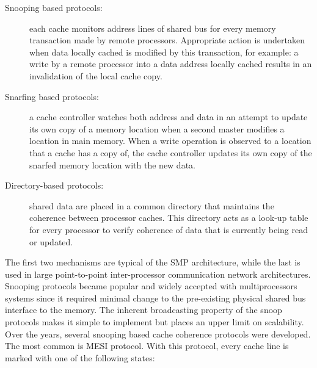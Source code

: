 \begin{description}

\item [Snooping based protocols:] each cache monitors address lines of shared bus for every memory transaction made by remote processors. Appropriate action
is undertaken when data locally cached is modified by this transaction, for example: a write by a remote processor into a data address locally cached 
results in an invalidation of the local cache copy.

\item [Snarfing based protocols:] a cache controller watches both address and data in an attempt to update its own copy of a memory location when a second 
master modifies a location in main memory. When a write operation is observed to a location that a cache has a copy of, the cache controller updates its 
own copy of the snarfed memory location with the new data.

\item [Directory-based protocols:] shared data are placed in a common directory that maintains the coherence between processor caches. 
This directory acts as a look-up table for every processor to verify coherence of data that is currently being read or updated.

\end{description}


The first two mechanisms are typical of the SMP architecture, while the last is used in large point-to-point inter-processor communication network 
architectures. Snooping protocols became popular and widely accepted with multiprocessors systems since it required minimal change to the pre-existing 
physical shared bus interface to the memory. The inherent broadcasting property of the snoop protocols makes it simple to implement but places an upper 
limit on scalability.
Over the years, several snooping based cache coherence protocols were developed. The most common is MESI protocol.
With this protocol, every cache line is marked with one of the following states:


